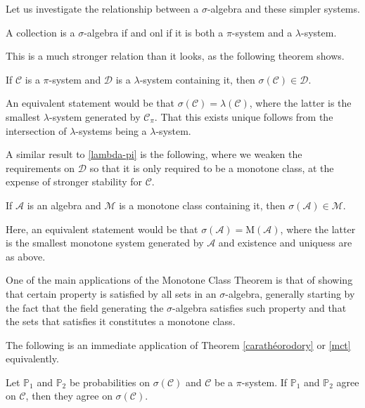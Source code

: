 Let us investigate the relationship between a $\sigma$-algebra and these simpler systems. 
\begin{my_lemma}
	A collection is a $\sigma$-algebra if and onl if it is both a $\pi$-system and a $\lambda$-system.	
\end{my_lemma}
This is a much stronger relation than it looks, as the following theorem shows.
\begin{my_theorem}
	\label{lambda-pi}
	If $\mathcal{C}$ is a $\pi$-system and $\mathcal{D}$ is a $\lambda$-system containing it, then $\sigma(\mathcal{C}) \in \mathcal{D}$.
\end{my_theorem}
\begin{my_remark}
	An equivalent statement would be that $\sigma(\mathcal{C}) = \lambda(\mathcal{C})$, where the latter is the smallest $\lambda$-system generated by $\mathcal{C}_\pi$. That this exists unique follows from the intersection of $\lambda$-systems being a $\lambda$-system.
\end{my_remark}
A similar result to \ref{lambda-pi} is the following, where we weaken the requirements on $\mathcal{D}$ so that it is only required to be a monotone class, at the expense of stronger stability for $\mathcal{C}$.
\begin{my_theorem}
	\label{mct}
	If $\mathcal{A}$ is an algebra and $\mathcal{M}$ is a monotone class containing it, then $\sigma(\mathcal{A}) \in \mathcal{M}$.	
\end{my_theorem}
\begin{my_remark}
	Here, an equivalent statement would be that $ \sigma \left( \mathcal{A} \right) = \mathrm{M} \left( \mathcal{A} \right) $, where the latter is the smallest monotone system generated by $\mathcal{A}$ and existence and uniquess are as above.
\end{my_remark}
\begin{my_remark}
	One of the main applications of the Monotone Class Theorem is that of showing that certain property is satisfied by all sets in an $\sigma$-algebra, generally starting by the fact that the field generating the $\sigma$-algebra satisfies such property and that the sets that satisfies it constitutes a monotone class.
\end{my_remark}
The following is an immediate application of Theorem \ref{carathéorodory} or \ref{mct} equivalently.
\begin{my_lemma}
	Let $\mathbb{P}_1$ and $\mathbb{P}_2$ be probabilities on $\sigma(\mathcal{C})$ and $\mathcal{C}$ be a $\pi$-system. If $\mathbb{P}_1$ and $\mathbb{P}_2$ agree on $\mathcal{C}$, then they agree on $\sigma(\mathcal{C})$.
\end{my_lemma}

